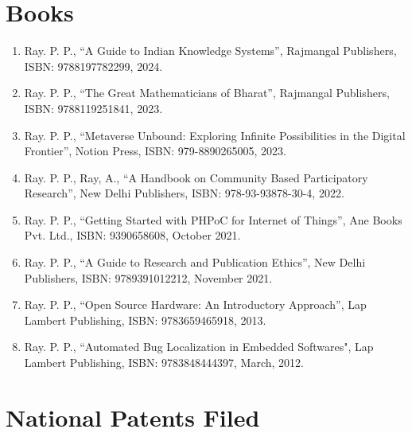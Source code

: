 \documentclass[11pt,a4paper]{moderncv}
\begin{document}
\section{\textbf{Books}}

\begin{adjustwidth}{6em}{0pt}
	\begin{enumerate}
		
		\item Ray. P. P., “A Guide to Indian Knowledge Systems”, Rajmangal Publishers, ISBN: 9788197782299, 2024.
		
		\item Ray. P. P., “The Great Mathematicians of Bharat”, Rajmangal Publishers, ISBN: 9788119251841, 2023.
		
		\item Ray. P. P., “Metaverse Unbound: Exploring Infinite Possibilities in the Digital Frontier”, Notion Press, ISBN: 979-8890265005, 2023.
		
		\item Ray. P. P., Ray, A., “A Handbook on Community Based Participatory Research”, New Delhi Publishers, ISBN: 978-93-93878-30-4, 2022.
		
		\item Ray. P. P., “Getting Started with PHPoC for Internet of Things”, Ane Books Pvt. Ltd., ISBN: 9390658608, October 2021.
		
		\item Ray. P. P., “A Guide to Research and Publication Ethics”, New Delhi Publishers, ISBN: 9789391012212, November 2021.
		
		\item Ray. P. P., “Open Source Hardware: An Introductory Approach”, Lap Lambert Publishing, ISBN: 9783659465918, 2013.
		
		\item Ray. P. P., “Automated Bug Localization in Embedded Softwares", Lap Lambert Publishing, ISBN: 9783848444397, March, 2012.
		
	\end{enumerate}
\end{adjustwidth}



\section{\textbf{National Patents Filed}}
\end{document}
